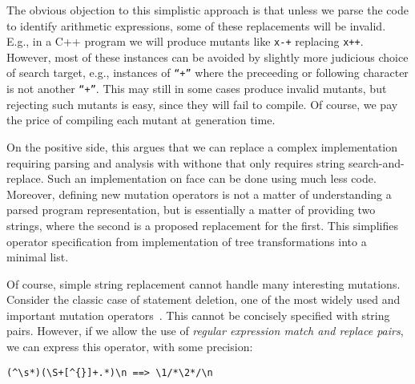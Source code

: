 \documentclass[sigconf,review, anonymous]{acmart}
\begin{document}
The obvious objection to this simplistic approach is that unless we
parse the code to identify arithmetic expressions, some of these
replacements will be invalid.  E.g., in a C++ program we will produce
mutants like {\tt x-+} replacing {\tt x++}.  However, most of these
instances can be avoided by slightly more judicious choice of search
target, e.g., instances of {\tt ``+''} where the preceeding or following
character is not another {\tt ``+''}.  This may still in some cases produce
invalid mutants, but rejecting such mutants is easy, since they will fail
to compile.  Of course, we pay the price of
compiling each mutant at generation
time.  

On the positive side, this argues that we can replace a
complex implementation requiring parsing and analysis with
withone that only requires string search-and-replace.
Such an implementation on face can be done using much less code. 
Moreover, defining new mutation operators is not a matter of
understanding a parsed program representation, but is essentially
a matter of providing two strings, where the second is a proposed
replacement for the first.  This simplifies operator specification from
implementation of
tree transformations into a minimal list. 

Of course, simple string replacement cannot handle
many interesting mutations.  Consider the classic case of statement
deletion, one of the most widely used and important mutation
operators~\cite{deng2013empirical}. This cannot be concisely specified with string pairs. 
However, if we allow the use of
\emph{regular expression match and replace pairs}, we can express this operator, with some precision:

\begin{verbatim}
(^\s*)(\S+[^{}]+.*)\n ==> \1/*\2*/\n
\end{verbatim}
\end{document}
